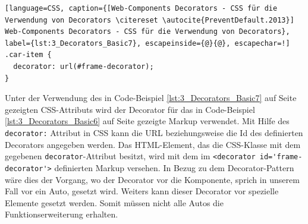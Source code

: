 \begin{lstlisting}[language=CSS, caption={[Web-Components Decorators - CSS für die Verwendung von Decorators \citereset \autocite{PreventDefault.2013}] Web-Components Decorators - CSS für die Verwendung von Decorators}, label={lst:3_Decorators_Basic7}, escapeinside={@}{@}, escapechar=!]
.car-item {
  decorator: url(#frame-decorator);
}
\end{lstlisting}

Unter der Verwendung des in Code-Beispiel \ref{lst:3_Decorators_Basic7} auf Seite \pageref{lst:3_Decorators_Basic7} gezeigten CSS-Attributs wird der Decorator für das in Code-Beispiel \ref{lst:3_Decorators_Basic6} auf Seite \pageref{lst:3_Decorators_Basic6} gezeigte Markup verwendet. Mit Hilfe des \lstinline|decorator:| Attribut in CSS kann die URL beziehungsweise die Id des definierten Decorators angegeben werden. Das HTML-Element, das die CSS-Klasse mit dem gegebenen \lstinline|decorator|-Attribut besitzt, wird mit dem im \lstinline|<decorator id='frame-decorator'>| definierten Markup versehen. In Bezug zu dem Decorator-Pattern wäre dies der Vorgang, wo der Decorator vor die Komponente, sprich in unserem Fall vor ein Auto, gesetzt wird. Weiters kann dieser Decorator vor spezielle Elemente gesetzt werden. Somit müssen nicht alle Autos die Funktionserweiterung erhalten.
